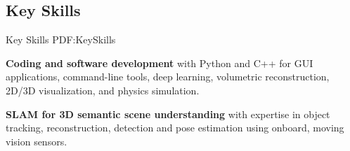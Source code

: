 \documentclass[letterpaper,MMMyyyy,nonstop]{simpleresumecv}
\begin{document}
\begin{body}
%
%
%
%


\section
{Key Skills}
{Key Skills}
{PDF:KeySkills}

\BulletItem
\textbf{Coding and software development} with Python and C++ for GUI applications, command-line tools, deep learning, volumetric reconstruction, 2D/3D visualization, and physics simulation.

\GapNoBreak

\BulletItem
\textbf{SLAM for 3D semantic scene understanding} with expertise in object tracking, reconstruction, detection and pose estimation using onboard, moving vision sensors.

\GapNoBreak


\end{body}
\end{document}
